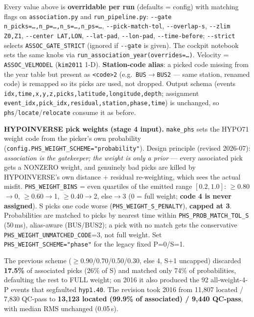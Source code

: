 \documentclass[11pt]{article}
\newcommand{\code}[1]{\texttt{#1}}
\begin{document}
Every value above is \textbf{overridable per run} (defaults = config) with matching flags on
\code{association.py} and \code{run\_pipeline.py}: \code{-{}-gate n\_picks=…,n\_p=…,n\_s=…,n\_ps=…},
\code{-{}-pick-match-tol}, \code{-{}-overlap-s}, \code{-{}-zlim Z0,Z1}, \code{-{}-center LAT,LON},
\code{-{}-lat-pad}, \code{-{}-lon-pad}, \code{-{}-time-before}; \code{-{}-strict} selects
\code{ASSOC\_GATE\_STRICT} (ignored if \code{-{}-gate} is given). The cockpit notebook sets the same knobs via
\code{run\_association\_year(overrides=…)}. Velocity = \code{ASSOC\_VELMODEL} (\code{kim2011} 1-D).
\textbf{Station-code alias}: a picked code missing from the year table but present as \code{<code>2}
(e.g.\ \code{BUS}$\to$\code{BUS2} — same station, renamed code) is remapped so its picks are used, not dropped.
Output schema (events \code{idx,time,x,y,z,picks,latitude,longitude,depth}; assignment
\code{event\_idx,pick\_idx,residual,station,phase,time}) is unchanged, so \code{phs}/\code{locate}/\code{relocate}
consume it as before.

\smallskip\noindent\textbf{HYPOINVERSE pick weights (stage 4 input).} \code{make\_phs} sets the HYPO71 weight
code from the picker's own probability (\code{config.PHS\_WEIGHT\_SCHEME="probability"}). Design principle
(revised 2026-07): \emph{association is the gatekeeper; the weight is only a prior} --- every associated pick
gets a NONZERO weight, and genuinely bad picks are killed by HYPOINVERSE's own distance + residual re-weighting,
which sees the actual misfit. \code{PHS\_WEIGHT\_BINS} = even quartiles of the emitted range $[0.2, 1.0]$:
$\ge$0.80$\to$0, $\ge$0.60$\to$1, $\ge$0.40$\to$2, else$\to$3 (0 = full weight; \textbf{code 4 is never
assigned}). S picks one code worse (\code{PHS\_WEIGHT\_S\_PENALTY}), \textbf{capped at 3}. Probabilities are
matched to picks by nearest time within \code{PHS\_PROB\_MATCH\_TOL\_S} (50\,ms), alias-aware (BUS/BUS2);
a pick with no match gets the conservative \code{PHS\_WEIGHT\_UNMATCHED\_CODE}=3, not full weight.
Set \code{PHS\_WEIGHT\_SCHEME="phase"} for the legacy fixed P=0/S=1.

\smallskip\noindent The previous scheme ($\ge$0.90/0.70/0.50/0.30, else 4, S+1 uncapped) discarded
\textbf{17.5\%} of associated picks (26\% of S) and matched only 74\% of probabilities, defaulting the rest to
FULL weight; on 2016 it also produced the 92 all-weight-4-P events that segfaulted \code{hyp1.40}. The revision
took 2016 from 11{,}807 located / 7{,}830 QC-pass to \textbf{13{,}123 located (99.9\% of associated) /
9{,}440 QC-pass}, with median RMS unchanged (0.05\,s).
\end{document}
